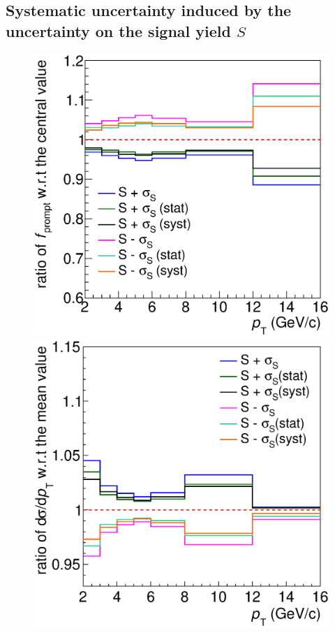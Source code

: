 \documentclass[b5paper,10pt,twoside,oldstyle,classica]{toptesi}
\begin{document}
\subsection{Systematic uncertainty induced by the uncertainty on the signal yield $S$}
\begin{figure}[b]
\begin{center}
{\includegraphics[scale = 0.32]{promptfraction_syst_SoverT_onlyratio.eps}}
\hspace{-0.6cm}
{\includegraphics[scale = 0.32]{promptcrosssection_syst_SoverT_ratioonly.eps}}

\end{center}
\end{figure}
\end{document}
